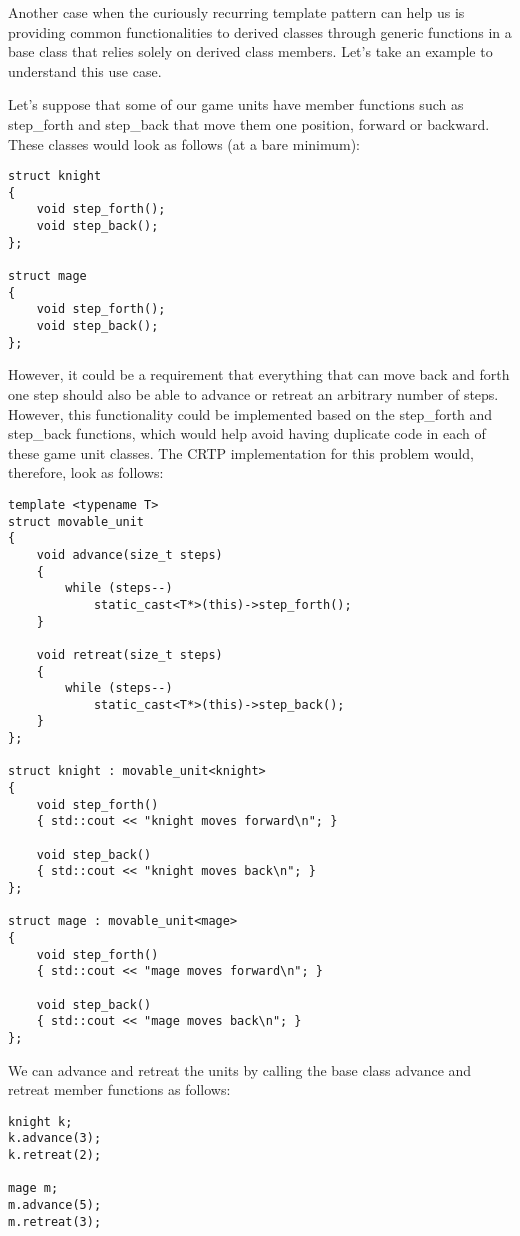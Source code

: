 Another case when the curiously recurring template pattern can help us is providing common functionalities to derived classes through generic functions in a base class that relies solely on derived class members. Let’s take an example to understand this use case.

Let’s suppose that some of our game units have member functions such as step\_forth and step\_back that move them one position, forward or backward. These classes would look as follows (at a bare minimum):

\begin{lstlisting}[style=styleCXX]
struct knight
{
	void step_forth();
	void step_back();
};

struct mage
{
	void step_forth();
	void step_back();
};
\end{lstlisting}

However, it could be a requirement that everything that can move back and forth one step should also be able to advance or retreat an arbitrary number of steps. However, this functionality could be implemented based on the step\_forth and step\_back functions, which would help avoid having duplicate code in each of these game unit classes. The CRTP implementation for this problem would, therefore, look as follows:

\begin{lstlisting}[style=styleCXX]
template <typename T>
struct movable_unit
{
	void advance(size_t steps)
	{
		while (steps--)
			static_cast<T*>(this)->step_forth();
	}

	void retreat(size_t steps)
	{
		while (steps--)
			static_cast<T*>(this)->step_back();
	}
};

struct knight : movable_unit<knight>
{
	void step_forth()
	{ std::cout << "knight moves forward\n"; }
	
	void step_back()
	{ std::cout << "knight moves back\n"; }
};

struct mage : movable_unit<mage>
{
	void step_forth()
	{ std::cout << "mage moves forward\n"; }
	
	void step_back()
	{ std::cout << "mage moves back\n"; }
};
\end{lstlisting}

We can advance and retreat the units by calling the base class advance and retreat member functions as follows:

\begin{lstlisting}[style=styleCXX]
knight k;
k.advance(3);
k.retreat(2);

mage m;
m.advance(5);
m.retreat(3);
\end{lstlisting}

